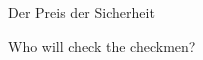 \documentclass[11pt]{beamer}
\begin{document}
\begin{frame}{Der Preis der Sicherheit}

\end{frame}

\begin{frame}{Who will check the checkmen?}

\end{frame}
\end{document}
